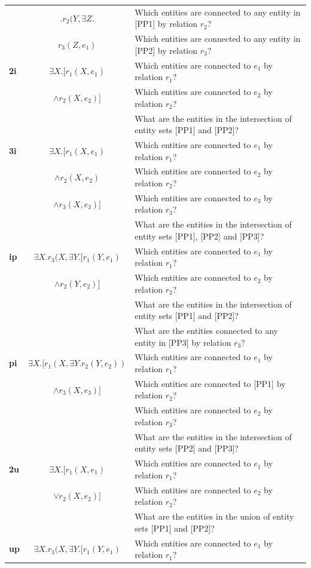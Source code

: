 \documentclass{article} %
\begin{document}
{\begin{table}[htbp]
{\begin{tabular}{l|c|p{27em}}
&$.r_2(Y, \exists Z.$&Which entities are connected to any entity in [PP1] by relation $r_2$?\\
&$r_3(Z, e_1)$&Which entities are connected to any entity in [PP2] by relation $r_3$?\\\hline
         \textbf{2i}& $\exists X.[r_1(X,e_1)$&Which entities are connected to $e_1$ by relation $r_1$?\\
&$\wedge r_2(X,e_2)]$&Which entities are connected to $e_2$ by relation $r_2$?\\
&&What are the entities in the intersection of entity sets [PP1] and [PP2]?\\\hline
         \textbf{3i}& $\exists X.[r_1(X,e_1)$&Which entities are connected to $e_1$ by relation $r_1$?\\
&$\wedge r_2(X,e_2)$&Which entities are connected to $e_2$ by relation $r_2$?\\
&$\wedge r_3(X,e_3)]$&Which entities are connected to $e_3$ by relation $r_3$?\\
&&What are the entities in the intersection of entity sets [PP1], [PP2] and [PP3]?\\\hline
         \textbf{ip}& $\exists X.r_3(X, \exists Y.[r_1(Y,e_1)$&Which entities are connected to $e_1$ by relation $r_1$?\\
&$\wedge r_2(Y,e_2)]$&Which entities are connected to $e_2$ by relation $r_2$?\\
&&What are the entities in the intersection of entity sets [PP1] and [PP2]?\\
&&What are the entities connected to any entity in [PP3] by relation $r_3$?\\\hline
         \textbf{pi}& $\exists X.[r_1(X,\exists Y.r_2(Y,e_2))$ & Which entities are connected to $e_1$ by relation $r_1$?\\
&$\wedge r_3(X,e_3)]$&Which entities are connected to [PP1] by relation $r_2$?\\
&&Which entities are connected to $e_2$ by relation $r_3$?\\
&&What are the entities in the intersection of entity sets [PP2] and [PP3]?\\\hline
         \textbf{2u}& $\exists X.[r_1(X,e_1)$&Which entities are connected to $e_1$ by relation $r_1$?\\
&$\vee r_2(X,e_2)]$&Which entities are connected to $e_2$ by relation $r_2$?\\
&&What are the entities in the union of entity sets [PP1] and [PP2]?\\\hline
         \textbf{up}& $\exists X.r_3(X, \exists Y.[r_1(Y,e_1)$&Which entities are connected to $e_1$ by relation $r_1$?\\

\end{tabular}}
\end{table}}
\end{document}
